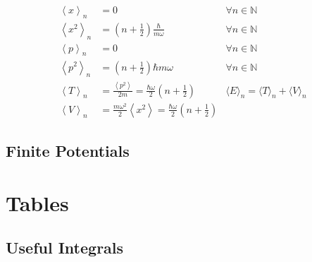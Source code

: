 \noindent\begin{align*}
    \left\langle x \right\rangle _n   & = 0                                                                                                    & \forall n \in \mathbb{N}                                     \\
    \left\langle x^2 \right\rangle _n & = \left(n+\frac{1}{2}\right)\frac{\hbar}{m\omega}                                                      & \forall n \in \mathbb{N}                                     \\
    \left\langle p \right\rangle _n   & = 0                                                                                                    & \forall n \in \mathbb{N}                                     \\
    \left\langle p^2 \right\rangle _n & = \left(n+\frac{1}{2}\right)\hbar m\omega                                                              & \forall n \in \mathbb{N}                                     \\
    \left\langle T \right\rangle _n   & = \frac{\left\langle p^2 \right\rangle}{2m} =  \frac{\hbar \omega}{2}\left(n+\frac{1}{2}\right)        & \langle E\rangle_n =  \langle T\rangle_n +\langle V\rangle_n \\
    \left\langle V \right\rangle _n   & = \frac{m\omega^2}{2}\left\langle x^2 \right\rangle = \frac{\hbar \omega}{2}\left(n+\frac{1}{2}\right)
\end{align*}

\subsection{Finite Potentials}

\section{Tables}
\subsection{Useful Integrals}
